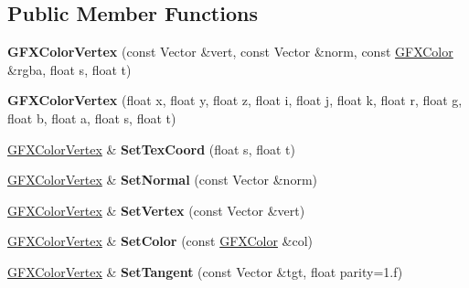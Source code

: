 \subsection*{Public Member Functions}
\begin{DoxyCompactItemize}
\item 
{\bfseries G\+F\+X\+Color\+Vertex} (const Vector \&vert, const Vector \&norm, const \hyperlink{structGFXColor}{G\+F\+X\+Color} \&rgba, float s, float t)\hypertarget{structGFXColorVertex_a35ca79ea69ce008bd3cd9aee2ae005a8}{}\label{structGFXColorVertex_a35ca79ea69ce008bd3cd9aee2ae005a8}

\item 
{\bfseries G\+F\+X\+Color\+Vertex} (float x, float y, float z, float i, float j, float k, float r, float g, float b, float a, float s, float t)\hypertarget{structGFXColorVertex_ac048da939de2a3f9da0c5a0323d78a4c}{}\label{structGFXColorVertex_ac048da939de2a3f9da0c5a0323d78a4c}

\item 
\hyperlink{structGFXColorVertex}{G\+F\+X\+Color\+Vertex} \& {\bfseries Set\+Tex\+Coord} (float s, float t)\hypertarget{structGFXColorVertex_a79c7f63626fc1cb54fc49fa3dfd1ec21}{}\label{structGFXColorVertex_a79c7f63626fc1cb54fc49fa3dfd1ec21}

\item 
\hyperlink{structGFXColorVertex}{G\+F\+X\+Color\+Vertex} \& {\bfseries Set\+Normal} (const Vector \&norm)\hypertarget{structGFXColorVertex_ad9df04fcb5b1df40e888fafac22a3f66}{}\label{structGFXColorVertex_ad9df04fcb5b1df40e888fafac22a3f66}

\item 
\hyperlink{structGFXColorVertex}{G\+F\+X\+Color\+Vertex} \& {\bfseries Set\+Vertex} (const Vector \&vert)\hypertarget{structGFXColorVertex_a6711fef8ee7188434c1603516e3701e3}{}\label{structGFXColorVertex_a6711fef8ee7188434c1603516e3701e3}

\item 
\hyperlink{structGFXColorVertex}{G\+F\+X\+Color\+Vertex} \& {\bfseries Set\+Color} (const \hyperlink{structGFXColor}{G\+F\+X\+Color} \&col)\hypertarget{structGFXColorVertex_a8df43d7a3f11c0a8af1f932c8e95a1e2}{}\label{structGFXColorVertex_a8df43d7a3f11c0a8af1f932c8e95a1e2}

\item 
\hyperlink{structGFXColorVertex}{G\+F\+X\+Color\+Vertex} \& {\bfseries Set\+Tangent} (const Vector \&tgt, float parity=1.f)\hypertarget{structGFXColorVertex_a073320c3d4503176d7bb75aecd3e287f}{}\label{structGFXColorVertex_a073320c3d4503176d7bb75aecd3e287f}


\end{DoxyCompactItemize}

